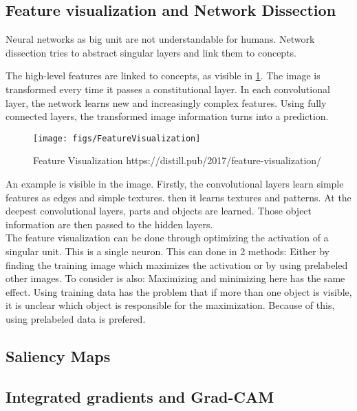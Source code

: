 \subsection{Feature visualization and Network Dissection}

Neural networks as big unit are not understandable for humans. Network dissection tries to abstract singular layers and link them to concepts.

The high-level features are linked to concepts, as visible in \ref{fig:feature-visualization}. The image is transformed every time it passes a constitutional layer. In each convolutional layer, the network learns new and increasingly complex features. Using fully connected layers, the transformed image information turns into a prediction.

\begin{figure}[h!]
	\centering
	\texttt{[image: figs/FeatureVisualization]}
	\caption{Feature Visualization https://distill.pub/2017/feature-visualization/}
	\label{fig:feature-visualization}
\end{figure}

An example is visible in the image. Firstly, the convolutional layers learn simple features as edges and simple textures. then it learns textures and patterns. At the deepest convolutional layers, parts and objects are learned. Those object information are then passed to the hidden layers.
\\

The feature visualization can be done through optimizing the activation of a singular unit. This is a single neuron. This can done in 2 methods: Either by finding the training image which maximizes the activation or by using prelabeled other images. To consider is also: Maximizing and minimizing here has the same effect.
Using training data has the problem that if more than one object is visible, it is unclear which object is responsible for the maximization. Because of this, using prelabeled data is prefered.


\subsection{Saliency Maps}

\subsection{Integrated gradients and Grad-CAM}




